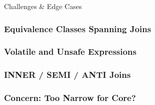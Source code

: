 \documentclass{beamer}
\begin{document}

\begin{frame}
\vspace*{\fill}\begin{center}
\huge{Challenges \& Edge Cases}
\end{center}\vspace*{\fill}
\end{frame}

\begin{frame}\frametitle{Equivalence Classes Spanning Joins}
\end{frame}

\begin{frame}\frametitle{Volatile and Unsafe Expressions}
\end{frame}

\begin{frame}\frametitle{INNER / SEMI / ANTI Joins}
%
\end{frame}

\begin{frame}\frametitle{Concern: Too Narrow for Core?}
%
\end{frame}
\end{document}
